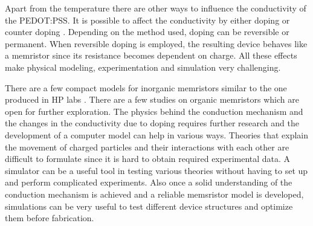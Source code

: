 \begin{doublespace}
Apart from the temperature there are other ways to influence the conductivity of the PEDOT:PSS. It is possible to affect the conductivity by either doping or counter doping \cite{PedotDope}. Depending on the method used, doping can be reversible or permanent. When reversible doping is employed, the resulting device behaves like a memristor since its resistance becomes dependent on charge. All these effects make physical modeling, experimentation and simulation very challenging. 

There are a few compact models for inorganic memristors similar to the one produced in HP labs \cite{ChuaSim}\cite{MemCircuitSim}\cite{MemTiO2}. There are a few studies on organic memristors \cite{OrganicMemSim}\cite{OrganicMem} which are open for further exploration. The physics behind the conduction mechanism and the changes in the conductivity due to doping requires further research and the development of a computer model can help in various ways. Theories that explain the movement of charged particles and their interactions with each other are difficult to formulate since it is hard to obtain required experimental data. A simulator can be a useful tool in testing various theories without having to set up and perform complicated experiments. Also once a solid understanding of the conduction mechanism is achieved and a reliable memsristor model is developed, simulations can be very useful to test different device structures and optimize them before fabrication. 


 \end{doublespace}